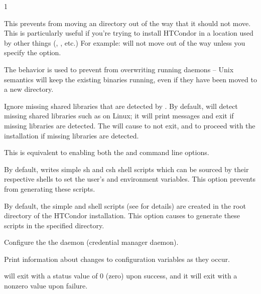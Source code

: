 \begin{ManPage}{\label{man-condor-configure}}{1}
\begin{Options}
{    This prevents  from moving an 
    directory out of the way that it should not move.  This is
    particularly useful if you're trying to install HTCondor in a
    location used by other things (, , etc.)
    For example:  
         will not move
     out of the way unless you specify the
     option.

    The  behavior is used to
    prevent  from overwriting running daemons --
    Unix semantics will keep the existing binaries running, even
    if they have been moved to a new directory.}

   {
    Ignore missing shared libraries that are detected by
    .  By default,  will detect
    missing shared libraries such as  on
    Linux; it will print messages and exit if missing libraries
    are detected.  The  will cause
     to not exit, and to proceed with the
    installation if missing libraries are detected.  }

   {
    This is equivalent to enabling both the  and
     command line options.  }

   {
    By default,  writes simple sh and csh
    shell scripts which can be sourced by their respective
    shells to set the user's  and 
    environment
    variables.  This option prevents  from
    generating these scripts.  }

   {
    By default, the simple  and  shell scripts (see
     for details) are created in 
    the root directory of the HTCondor installation.  This option
    causes  to generate these scripts in the
    specified directory.  }

   {Configure the
    the  daemon (credential manager daemon).}

   {Print information about changes
    to configuration variables as they occur.}
\end{Options}

\ExitStatus

 will exit with a status value of 0 (zero) upon success,
and it will exit with a nonzero value upon failure.


\end{ManPage}
